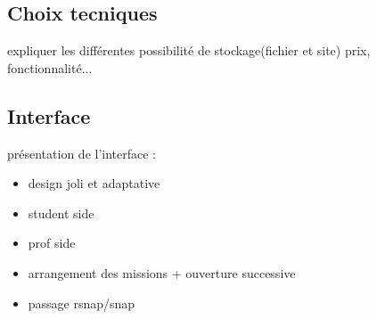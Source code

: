 \subsection{Choix tecniques}
expliquer les différentes possibilité de stockage(fichier et site) prix, fonctionnalité...

\subsection{Interface}
présentation de l'interface :
\begin{itemize}
  \item design joli et adaptative
  \item student side
  \item prof side
  \item arrangement des missions + ouverture successive
  \item passage rsnap/snap
\end{itemize}